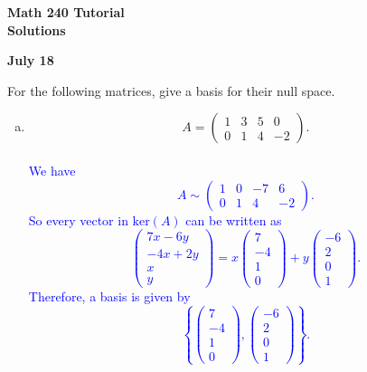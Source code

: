 \documentclass[a4paper,11pt]{article}
\newcommand{\blue}[1]{\textcolor{blue}{#1}}
\begin{document}
\begin{center}
  {\Large\bfseries Math 240 Tutorial \\ Solutions}
\end{center}
\begin{center}
  {\bfseries July 18}
\end{center}

 For the following matrices, give a basis for their
null space.
\begin{enumerate}[(a)]
\item
  \[
    A =
    \left(
      \begin{array}{rrrr}
        1 & 3 & 5 & 0 \\ 0 & 1 & 4 & -2
      \end{array}
    \right).
  \] \\

  \blue{We have
    \[
      A \sim
      \left(
        \begin{array}{rrrr}
          1 & 0 & -7 & 6 \\ 0 & 1 & 4 & -2
        \end{array}
      \right).
    \]
    So every vector in $\text{ker}(A)$ can be written as
    \[
      \left(
        \begin{array}{c}
          7x-6y \\ -4x+2y \\ x \\ y
        \end{array}
      \right)
      =x
      \left(
        \begin{array}{r}
          7 \\ -4 \\ 1 \\ 0
        \end{array}
      \right)
      +y
      \left(
        \begin{array}{r}
          -6 \\ 2 \\ 0 \\ 1
        \end{array}
      \right).
    \]
    Therefore, a basis is given by
    \[
      \left\{
        \left(
          \begin{array}{r}
            7 \\ -4 \\ 1 \\ 0
          \end{array}
        \right),
        \left(
          \begin{array}{r}
            -6 \\ 2 \\ 0 \\ 1
          \end{array}
        \right)
      \right\}.
    \] \\}
  

\end{enumerate}
\end{document}
